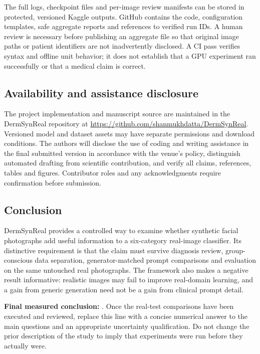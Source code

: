 The full logs, checkpoint files and per-image review manifests can be stored in protected, versioned Kaggle outputs. GitHub contains the code, configuration templates, safe aggregate reports and references to verified run IDs. A human review is necessary before publishing an aggregate file so that original image paths or patient identifiers are not inadvertently disclosed. A CI pass verifies syntax and offline unit behavior; it does not establish that a GPU experiment ran successfully or that a medical claim is correct.

\subsection{Availability and assistance disclosure}
The project implementation and manuscript source are maintained in the DermSynReal repository at \url{https://github.com/shanmukhdatta/DermSynReal}. Versioned model and dataset assets may have separate permissions and download conditions. The authors will disclose the use of coding and writing assistance in the final submitted version in accordance with the venue's policy, distinguish automated drafting from scientific contribution, and verify all claims, references, tables and figures. Contributor roles and any acknowledgments require confirmation before submission.

\subsection{Conclusion}
DermSynReal provides a controlled way to examine whether synthetic facial photographs add useful information to a six-category real-image classifier. Its distinctive requirement is that the claim must survive diagnosis review, group-conscious data separation, generator-matched prompt comparisons and evaluation on the same untouched real photographs. The framework also makes a negative result informative: realistic images may fail to improve real-domain learning, and a gain from generic generation need not be a gain from clinical prompt detail.

\noindent\textbf{Final measured conclusion:} \Pending. Once the real-test comparisons have been executed and reviewed, replace this line with a concise numerical answer to the main questions and an appropriate uncertainty qualification. Do not change the prior description of the study to imply that experiments were run before they actually were.
